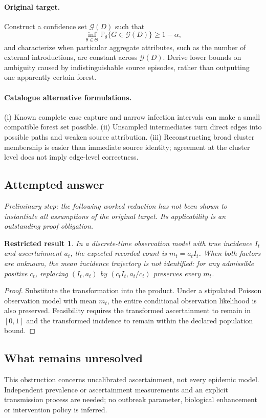 \documentclass[11pt]{article}
\newcommand{\Prob}{\mathbb P}
\providecommand{\Prob}{\mathbb P}
\newtheorem{attemptresult}{Restricted result}[section]
\begin{document}
\paragraph{Original target.}
Construct a confidence set $\mathcal G(D)$ such that
    \[\inf_{\theta\in\Theta}\Prob_\theta\{G\in\mathcal G(D)\}\geq1-\alpha,\]
    and characterize when particular aggregate attributes, such as the number of external introductions, are constant across $\mathcal G(D)$. Derive lower bounds on ambiguity caused by indistinguishable source episodes, rather than outputting one apparently certain forest.
\paragraph{Catalogue alternative formulations.}
(i) Known complete case capture and narrow infection intervals can make a small compatible forest set possible. (ii) Unsampled intermediates turn direct edges into possible paths and weaken source attribution. (iii) Reconstructing broad cluster membership is easier than immediate source identity; agreement at the cluster level does not imply edge-level correctness.
\subsection{Attempted answer}
\noindent\emph{Preliminary step: the following worked reduction has not been shown to instantiate all assumptions of the original target. Its applicability is an outstanding proof obligation.}

\begin{attemptresult}
In a discrete-time observation model with true incidence $I_t$ and ascertainment $a_t$, the expected recorded count is $m_t=a_tI_t$. When both factors are unknown, the mean incidence trajectory is not identified: for any admissible positive $c_t$, replacing $(I_t,a_t)$ by $(c_tI_t,a_t/c_t)$ preserves every $m_t$.
\end{attemptresult}
\begin{proof}
Substitute the transformation into the product. Under a stipulated Poisson observation model with mean $m_t$, the entire conditional observation likelihood is also preserved. Feasibility requires the transformed ascertainment to remain in $[0,1]$ and the transformed incidence to remain within the declared population bound.
\end{proof}
\subsection{What remains unresolved}
This obstruction concerns uncalibrated ascertainment, not every epidemic model. Independent prevalence or ascertainment measurements and an explicit transmission process are needed; no outbreak parameter, biological enhancement or intervention policy is inferred.
\end{document}
